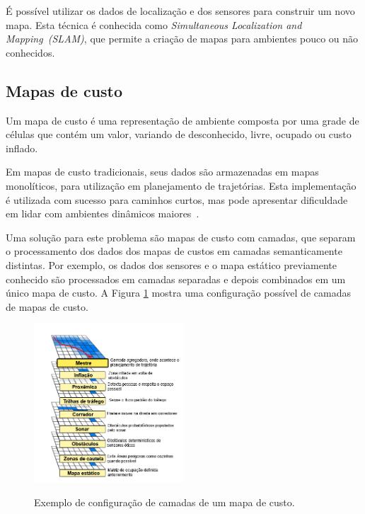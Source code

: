 \documentclass[repeatfields,xlists,xpacks,oneside,yearsonly]{ufrgscca}
\begin{document}
É possível utilizar os dados de localização e dos sensores para construir um novo mapa.
Esta técnica é conhecida como \textit{Simultaneous Localization and Mapping~(SLAM)},
que permite a criação de mapas para ambientes pouco ou não conhecidos.

\subsection{Mapas de custo}

Um mapa de custo é uma representação de ambiente composta por uma
grade de células que contém um valor, variando de desconhecido, livre,
ocupado ou custo inflado.

Em mapas de custo tradicionais, seus dados são armazenadas em mapas monolíticos,
para utilização em planejamento de trajetórias.
Esta implementação é utilizada com sucesso para caminhos curtos,
mas pode apresentar dificuldade em lidar com ambientes dinâmicos
maiores~\cite{layered_costmaps}.

Uma solução para este problema são mapas de custo com camadas,
que separam o processamento dos dados dos mapas de custos em camadas semanticamente distintas.
Por exemplo, os dados dos sensores e o mapa estático previamente conhecido são processados
em camadas separadas e depois combinados em um único mapa de custo.
A Figura \ref{fig:mapa_camadas} mostra uma configuração possível de camadas
de mapas de custo.

\begin{figure}[htbp]
    {
        \centering
        \caption{Exemplo de configuração de camadas de um mapa de custo.}
        \label{fig:mapa_camadas}
        \includegraphics[width=0.5\textwidth]{mapa_camadas_trad.png}\\
    }
    {} %
\end{figure}
\end{document}
